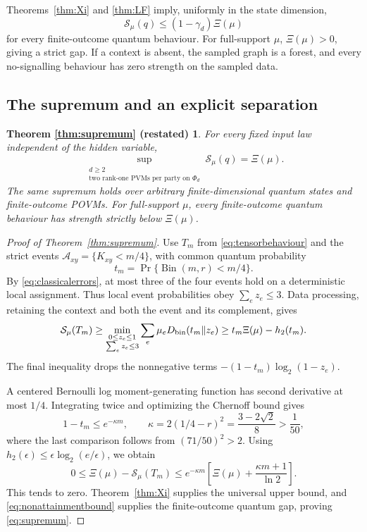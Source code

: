 \documentclass[11pt]{amsart}
\theoremstyle{remark}
\theoremstyle{plain}
\newtheorem*{supremumagain}{Theorem \ref{thm:supremum} (restated)}
\numberwithin{equation}{section}
\DeclareMathOperator{\Bin}{Bin}
\begin{document}
Theorems~\ref{thm:Xi} and \ref{thm:LF} imply, uniformly in the state
dimension,
\begin{equation}\label{eq:nonattainmentbound}
 \mathcal S_\mu(q)\le(1-\gamma_d)\Xi(\mu)
\end{equation}
for every finite-outcome quantum behaviour.
For full-support \(\mu\), \(\Xi(\mu)>0\), giving a strict gap.
If a context is absent, the sampled graph is a forest, and every
no-signalling behaviour has zero strength on the sampled data.

\subsection{The supremum and an explicit separation}

\begin{supremumagain}
For every fixed input law independent of the hidden variable,
\[
 \sup_{\substack{d\ge2\\
     \text{two rank-one PVMs per party on }\Phi_d}}
 \mathcal S_\mu(q)=\Xi(\mu).
\]
The same supremum holds over arbitrary finite-dimensional quantum
states and finite-outcome POVMs. For full-support \(\mu\), every
finite-outcome quantum behaviour has strength strictly below
\(\Xi(\mu)\).
\end{supremumagain}

\begin{proof}[Proof of Theorem~\ref{thm:supremum}]
Use \(T_m\) from \eqref{eq:tensorbehaviour} and the strict events
\(\mathcal A_{xy}=\{K_{xy}<m/4\}\), with common quantum probability
\[
 t_m=\Pr\{\Bin(m,r)<m/4\}.
\]
By \eqref{eq:classicalerrors}, at most three of the four events hold
on a deterministic local assignment. Thus local event probabilities
obey \(\sum_ez_e\le3\).
Data processing, retaining the context and both the event and its
complement, gives
\begin{equation*}
 \mathcal S_\mu(T_m)\ge
 \min_{\substack{0\le z_e\le1\\\sum_ez_e\le3}}
 \sum_e\mu_eD_{\rm bin}(t_m\Vert z_e)
 \ge t_m\Xi(\mu)-h_2(t_m).
\end{equation*}
The final inequality drops the nonnegative terms
\(-(1-t_m)\log_2(1-z_e)\).

A centered Bernoulli log moment-generating function has second
derivative at most \(1/4\). Integrating twice and optimizing the
Chernoff bound gives
\[
 1-t_m\le e^{-\kappa m},\qquad
 \kappa=2(1/4-r)^2=\frac{3-2\sqrt2}{8}>\frac1{50},
\]
where the last comparison follows from \((71/50)^2>2\).
Using \(h_2(\epsilon)\le\epsilon\log_2(e/\epsilon)\), we obtain
\begin{equation}\label{eq:KLrate}
 0\le\Xi(\mu)-\mathcal S_\mu(T_m)
 \le e^{-\kappa m}
 \left[\Xi(\mu)+\frac{\kappa m+1}{\ln2}\right].
\end{equation}
This tends to zero. Theorem~\ref{thm:Xi} supplies the universal
upper bound, and \eqref{eq:nonattainmentbound} supplies the
finite-outcome quantum gap, proving \eqref{eq:supremum}.
\end{proof}
\end{document}
